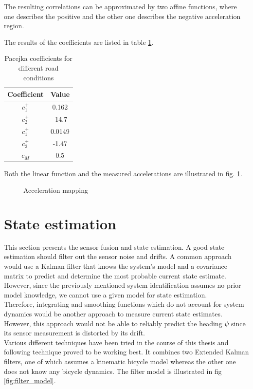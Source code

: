 The resulting correlations can be approximated by two affine functions, where one describes the positive and the other one describes the negative acceleration region.

The results of the coefficients are listed in table \ref{tab:v_mapping}.
\begin{table}[h!]
\centering
\begin{tabular}{c|c}
Coefficient & Value\\
\hline
$c_1^+$ & 0.162\\
$c_2^+$ & -14.7\\
$c_1^+$ & 0.0149\\
$c_2^+$ & -1.47\\
$c_M$ & 0.5
\end{tabular}
\caption{Pacejka coefficients for different road conditions}
\label{tab:v_mapping}
\end{table}

Both the linear function and the measured accelerations are illustrated in fig. \ref{fig:v_over_u}.

\begin{figure}[ht]
    \centering
      
    \caption{Acceleration mapping}
    \label{fig:v_over_u}
\end{figure}

\section{State estimation}
This section presents the sensor fusion and state estimation. A good state estimation should filter out the sensor noise and drifts. A common approach would use a Kalman filter that knows the system's model and a covariance matrix to predict and determine the most probable current state estimate. However, since the previously mentioned system identification assumes no prior model knowledge, we cannot use a given model for state estimation.\\
Therefore, integrating and smoothing functions which do not account for system dynamics would be another approach to measure current state estimates. However, this approach would not be able to reliably predict the heading $\psi$ since its sensor measurement is distorted by its drift.\\
Various different techniques have been tried in the course of this thesis and following technique proved to be working best. It combines two Extended Kalman filters, one of which assumes a kinematic bicycle model whereas the other one does not know any bicycle dynamics. The filter model is illustrated in fig \ref{fig:filter_model}.

